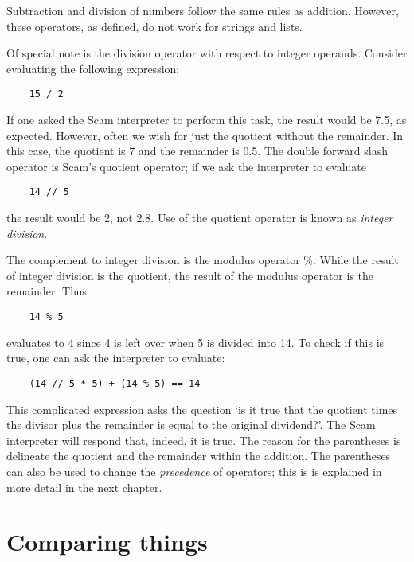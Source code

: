 Subtraction and division of numbers follow the
same rules as addition. However, these operators, as defined,
do not work for strings and lists.

Of special note is the division operator with respect to integer
operands. Consider evaluating the following expression:

\begin{verbatim}
    15 / 2
\end{verbatim}

If one asked the Scam interpreter to perform this task, the result
would be 7.5, as expected. However, often we wish for just
the quotient without the remainder. In this case, the
quotient is 7 and the remainder is 0.5. 
The double forward slash operator is Scam's quotient
operator; if we ask the interpreter to  evaluate

\begin{verbatim}
    14 // 5
\end{verbatim}

the result would be 2, not 2.8. 
Use of the quotient operator is known as {\it integer} {\it division}.

The complement to integer division is the modulus operator \%. While the
result of integer division is the quotient, the result of the modulus
operator is the remainder. Thus

\begin{verbatim}
    14 % 5
\end{verbatim}

evaluates to 4 since 4 is left over when 5 is divided into 14. To check
if this is true, one can ask the interpreter to evaluate:

\begin{verbatim}
    (14 // 5 * 5) + (14 % 5) == 14
\end{verbatim}

This complicated expression asks the question `is it true that the
quotient times the divisor plus the remainder is equal to the original
dividend?'. The Scam interpreter will respond that, indeed, it is
true. The reason for the parentheses is delineate
the quotient and the remainder within the addition.
The parentheses can also be used to change the {\it precedence}
of operators; this is
is explained in more detail in the
next chapter.

\section{Comparing things}

